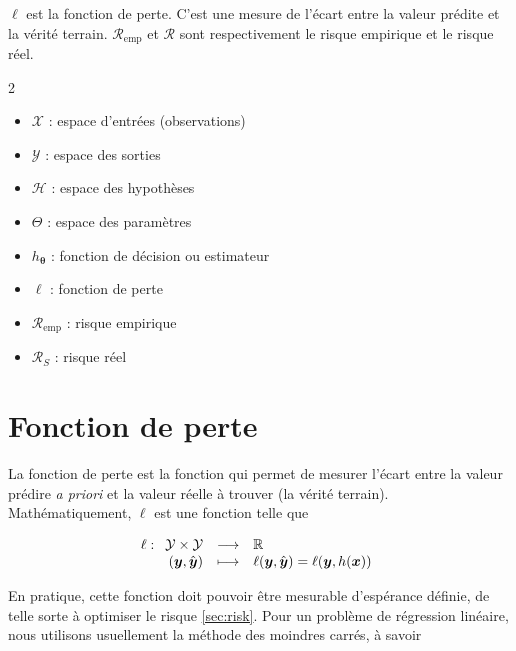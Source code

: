 \noindent $\ell$ est la fonction de perte. C'est une mesure de l'écart entre la valeur prédite et la vérité terrain. 
$\mathcal{R}_{\text{emp}}$ et $\mathcal{R}$ sont respectivement le risque empirique et le risque réel.  

\begin{multicols}{2}

\begin{itemize}
    \item $\mathcal{X}$ : espace d'entrées (observations)
    \item $\mathcal{Y}$ : espace des sorties 
    \item $\mathcal{H}$ : espace des hypothèses
    \item $\Theta$ : espace des paramètres
    \item $h_{\boldsymbol{\theta}}$ : fonction de décision ou estimateur
    \item $\ell$ : fonction de perte
    \item $\mathcal{R}_{\text{emp}}$ : risque empirique
    \item $\mathcal{R}_{S}$ : risque réel
\end{itemize}

\end{multicols}

\newpage

\section{Fonction de perte}

\noindent La fonction de perte est la fonction qui permet de mesurer l'écart entre la valeur prédire \textit{a priori} et la valeur réelle à trouver (la vérité terrain). Mathématiquement, $\ell$ est une fonction telle que \newline
 
\begin{equation}
    \ell : \begin{array}[t]{rcl} 
    \mathcal{Y} \times \mathcal{Y} & \longrightarrow & \mathbb{R} \\ 
    (\boldsymbol{y}, \hat{\boldsymbol{y}}) & \longmapsto & \ell(\boldsymbol{y},  \hat{\boldsymbol{y}}) = \ell(\boldsymbol{y}, h(\boldsymbol{x}))
    \end{array}
\end{equation}

\vspace{1em}

\noindent En pratique, cette fonction doit pouvoir être mesurable d'espérance définie, de telle sorte à optimiser le risque \ref{sec:risk}. Pour un problème de régression linéaire, nous utilisons usuellement la méthode des moindres carrés, à savoir 

